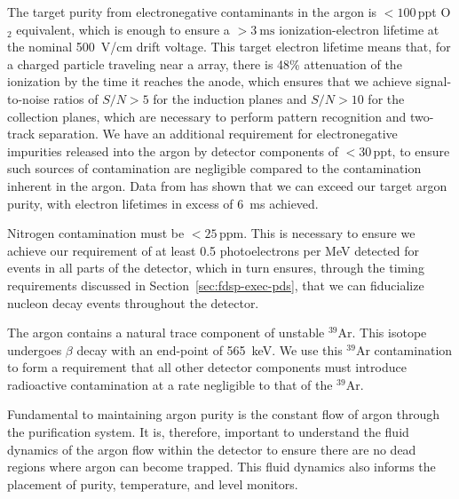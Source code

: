 The target purity from electronegative contaminants in the argon is $<\!\!100$\,ppt O$_{2}$ equivalent, which is enough to ensure a $>\!\!\SI{3}{\milli\second}$ ionization-electron lifetime at the nominal \SI{500}{\volt/\centi\meter} drift voltage. This target electron lifetime means that, for a charged particle traveling near a  array, there is 48\% attenuation of the ionization by the time it reaches the anode, which ensures that we achieve signal-to-noise ratios of $S/N>5$ for the induction planes and $S/N>10$ for the collection planes, which are necessary to perform pattern recognition and two-track separation. We have an additional requirement for electronegative impurities released into the argon by detector components of $<\!30$\,ppt, to ensure such sources of contamination are negligible compared to the contamination inherent in the argon. Data from  has shown that we can exceed our target argon purity, with electron lifetimes in excess of \SI{6}{\milli\second} achieved.

Nitrogen contamination must be $<\!25$\,ppm. This is necessary to ensure we achieve our requirement of at least 0.5 photoelectrons per MeV detected for events in all parts of the detector, which in turn ensures, through the timing requirements discussed in Section~\ref{sec:fdsp-exec-pds}, that we can fiducialize nucleon decay events throughout the detector.

The argon contains a natural trace component of unstable $^{39}$Ar. This isotope undergoes $\beta$ decay with an end-point of \SI{565}{\kilo\electronvolt}.
We use this $^{39}$Ar contamination to form a requirement that all other detector components must introduce radioactive contamination at a rate negligible to that of the $^{39}$Ar.

Fundamental to maintaining argon purity is the constant flow of argon through the purification system. It is, therefore, important to understand the fluid dynamics of the argon flow within the detector to ensure there are no dead regions where argon can become trapped. This fluid dynamics also informs the placement of purity, temperature, and level monitors.


